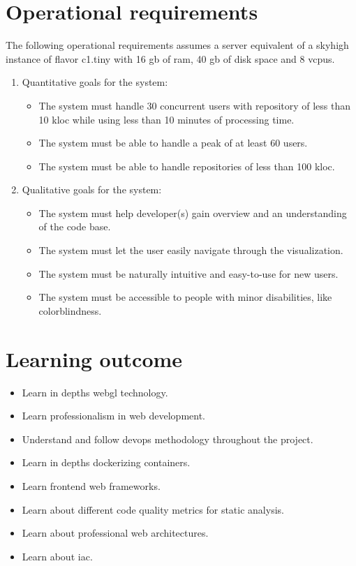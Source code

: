 \section{Operational requirements}
    The following operational requirements assumes a server equivalent of a \gls{skyhigh} instance of flavor c1.tiny with 16 \gls{gb} of ram, 40 \gls{gb} of disk space and 8 \glspl{vcpu}.  
    \begin{enumerate}  
        \item Quantitative goals for the system: 
        \begin{itemize}
            \item The system must handle 30 concurrent users with repository of less than 10 \gls{kloc} while using less than 10 minutes of processing time.
            \item The system must be able to handle a peak of at least 60 users.
            \item The system must be able to handle repositories of less than 100 \gls{kloc}. 
        \end{itemize}
        \item Qualitative goals for the system:
        \begin{itemize}
            \item The system must help developer(s) gain overview and an understanding of the code base.
            \item The system must let the user easily navigate through the visualization.
            \item The system must be naturally intuitive and easy-to-use for new users.
            \item The system must be accessible to people with minor disabilities, like colorblindness. 
        \end{itemize}
    \end{enumerate}
        
\section{Learning outcome}
    \begin{itemize}
        \item Learn in depths \gls{webgl} technology.
        \item Learn professionalism in web development.
        \item Understand and follow \gls{devops} methodology throughout the project.
        \item Learn in depths dockerizing containers.
        \item Learn \gls{frontend} web frameworks.
        \item Learn about different code quality metrics for static analysis.
        \item Learn about professional web architectures.
        \item Learn about \gls{iac}.
    \end{itemize}


